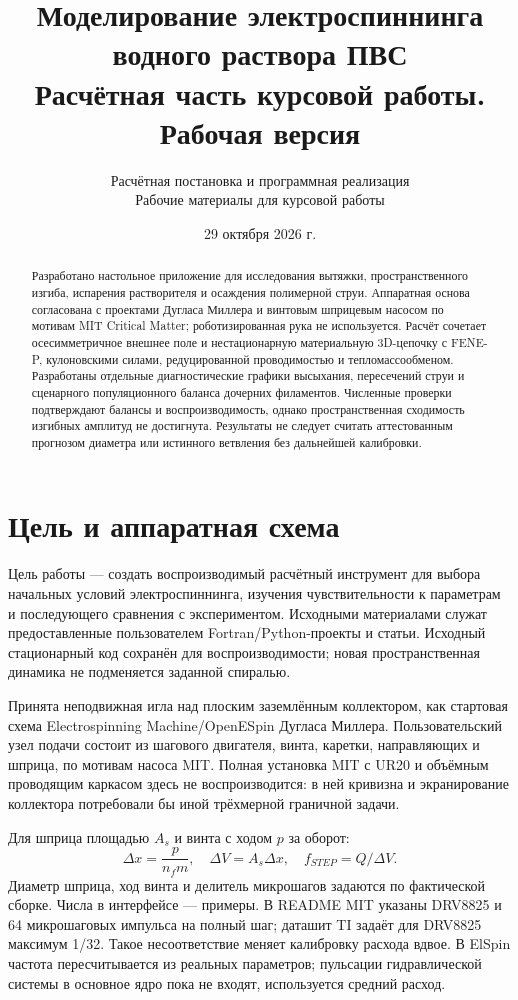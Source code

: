 \documentclass[12pt,a4paper]{article}
\title{Моделирование электроспиннинга водного раствора ПВС\\\large Расчётная часть курсовой работы. Рабочая версия}
\author{Расчётная постановка и программная реализация\\\small Рабочие материалы для курсовой работы}
\date{29 октября 2026 г.}
\begin{document}
\maketitle
\begin{abstract}
Разработано настольное приложение для исследования вытяжки, пространственного
изгиба, испарения растворителя и осаждения полимерной струи. Аппаратная основа
согласована с проектами Дугласа Миллера и винтовым шприцевым насосом по мотивам
MIT Critical Matter; роботизированная рука не используется. Расчёт сочетает
осесимметричное внешнее поле и нестационарную материальную 3D-цепочку с
FENE-P, кулоновскими силами, редуцированной проводимостью и тепломассообменом.
Разработаны отдельные диагностические графики высыхания, пересечений струи
и сценарного популяционного баланса дочерних филаментов. Численные проверки
подтверждают балансы и воспроизводимость, однако пространственная сходимость
изгибных амплитуд не достигнута. Результаты не следует считать аттестованным
прогнозом диаметра или истинного ветвления без дальнейшей калибровки.
\end{abstract}
\tableofcontents\newpage
\section{Цель и аппаратная схема}
Цель работы — создать воспроизводимый расчётный инструмент для выбора
начальных условий электроспиннинга, изучения чувствительности к параметрам
и последующего сравнения с экспериментом. Исходными материалами служат
предоставленные пользователем Fortran/Python-проекты и статьи. Исходный
стационарный код сохранён для воспроизводимости; новая пространственная
динамика не подменяется заданной спиралью.

Принята неподвижная игла над плоским заземлённым коллектором, как стартовая
схема Electrospinning Machine/OpenESpin Дугласа Миллера. Пользовательский
узел подачи состоит из шагового двигателя, винта, каретки, направляющих и
шприца, по мотивам насоса MIT. Полная установка MIT с UR20 и объёмным
проводящим каркасом здесь не воспроизводится: в ней кривизна и экранирование
коллектора потребовали бы иной трёхмерной граничной задачи.

Для шприца площадью $A_s$ и винта с ходом $p$ за оборот:
\[
 \Delta x=\frac{p}{n_f m},\quad \Delta V=A_s\Delta x,\quad
 f_{STEP}=Q/\Delta V.
\]
Диаметр шприца, ход винта и делитель микрошагов задаются по фактической
сборке. Числа в интерфейсе — примеры. В README MIT указаны DRV8825 и 64
микрошаговых импульса на полный шаг; даташит TI задаёт для DRV8825 максимум
1/32. Такое несоответствие меняет калибровку расхода вдвое. В ElSpin частота
пересчитывается из реальных параметров; пульсации гидравлической системы
в основное ядро пока не входят, используется средний расход.
\end{document}
